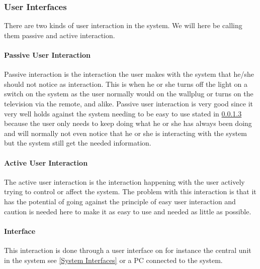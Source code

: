 \subsubsection{User Interfaces}
There are two kinds of user interaction in the system. We will here be calling them passive and active interaction.

\paragraph{Passive User Interaction}
Passive interaction is the interaction the user makes with the system that he/she should not notice as interaction. This is when he or she turns off the light on a switch on the system as the user normally would on the wallplug or turns on the television via the remote, and alike. Passive user interaction is very good since it very well holds against the system needing to be easy to use stated in \cref{} because the user only needs to keep doing what he or she has always been doing and will normally not even notice that he or she is interacting with the system but the system still get the needed information.

\paragraph{Active User Interaction}
The active user interaction is the interaction happening with the user actively trying to control or affect the system. The problem with this interaction is that it has the potential of going against the principle of easy user interaction and caution is needed here to make it as easy to use and needed as little as possible.

\paragraph{Interface}

This interaction is done through a user interface on for instance the central unit in the system see \cref{System Interfaces} or a PC connected to the system.



